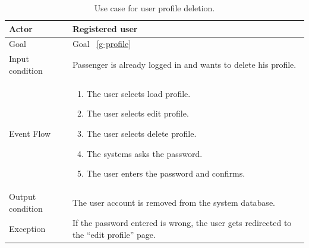 \begin{table}
\begin{center}
\begin{tabular}{| l | p{} |}
\hline
Actor & Registered user \\
\hline
Goal & Goal ~\ref{g-profile}
\\
\hline
Input condition & Passenger is already logged in and wants to delete his profile.  \\
\hline
Event Flow & \begin{enumerate}
	\item The user selects load profile.
	\item The user selects edit profile.
	\item The user selects delete profile.
	\item The systems asks the password.
	\item The user enters the password and confirms.
	\end{enumerate}
\\
\hline
Output condition & The user account is removed from the system database. \\
\hline

Exception & If the password entered is wrong, the user gets redirected to the ``edit profile'' page. \\
\hline
\end{tabular}
\end{center}
\caption{Use case for user profile deletion.}
\label{usecase-profile-delete}
\end{table}

